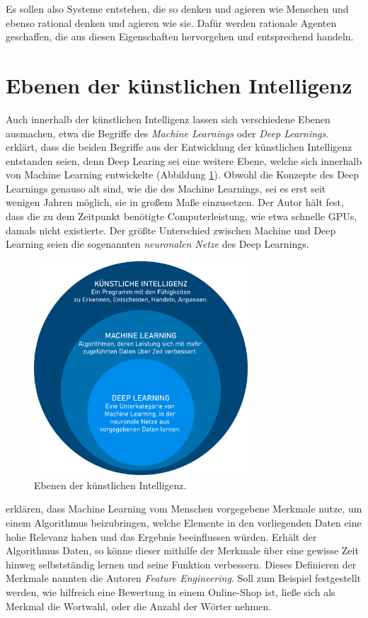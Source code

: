 Es sollen also Systeme entstehen, die so denken und agieren wie Menschen und ebenso rational denken und agieren wie sie. Dafür werden rationale Agenten geschaffen, die aus diesen Eigenschaften hervorgehen und entsprechend handeln.

\section{Ebenen der künstlichen Intelligenz}
Auch innerhalb der künstlichen Intelligenz lassen sich verschiedene Ebenen ausmachen, etwa die Begriffe des \textit{Machine Learnings} oder \textit{Deep Learnings}. \citet[]{copeland_2021} erklärt, dass die beiden Begriffe aus der Entwicklung der künstlichen Intelligenz entstanden seien, denn Deep Learing sei eine weitere Ebene, welche sich innerhalb von Machine Learning entwickelte (Abbildung \ref{KIKreise}). Obwohl die Konzepte des Deep Learnings genauso alt sind, wie die des Machine Learnings, sei es erst seit wenigen Jahren möglich, sie in großem Maße einzusetzen. Der Autor hält fest, dass die zu dem Zeitpunkt benötigte Computerleistung, wie etwa schnelle GPUs, damals nicht existierte. Der größte Unterschied zwischen Machine und Deep Learning seien die sogenannten \textit{neuronalen Netze} des Deep Learnings.\\

\begin{figure}[ht]
    \centering
    \includegraphics[width=8cm]{bilder/KIKreise2.jpg}
    \caption{Ebenen der künstlichen Intelligenz.}
    \label{KIKreise}
\end{figure}

\citet[]{Janiesch.2021} erklären, dass Machine Learning vom Menschen vorgegebene Merkmale nutze, um einem Algorithmus beizubringen, welche Elemente in den vorliegenden Daten eine hohe Relevanz haben und das Ergebnis beeinflussen würden. Erhält der Algorithmus Daten, so könne dieser mithilfe der Merkmale über eine gewisse Zeit hinweg selbstständig lernen und seine Funktion verbessern. Dieses Definieren der Merkmale nannten die Autoren \textit{Feature Engineering}. Soll zum Beispiel festgestellt werden, wie hilfreich eine Bewertung in einem Online-Shop ist, ließe sich als Merkmal die Wortwahl, oder die Anzahl der Wörter nehmen. \\

